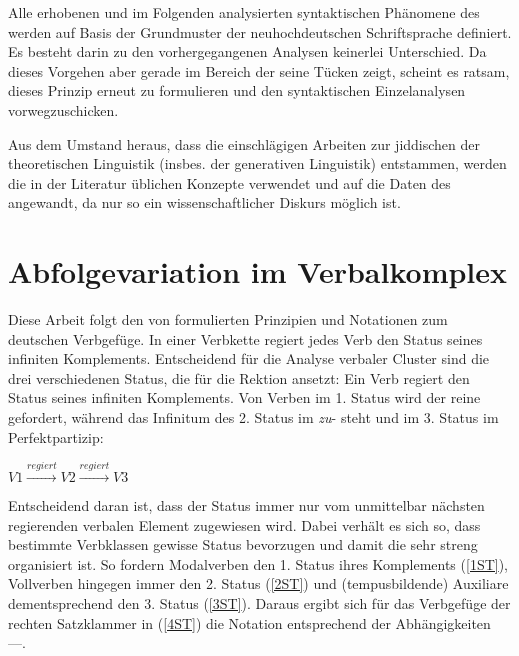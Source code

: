 Alle erhobenen und im Folgenden analysierten syntaktischen Phänomene des \hai{{\LiJi}} werden auf Basis der Grundmuster der neuhochdeutschen Schriftsprache definiert. Es besteht darin zu den vorhergegangenen Analysen keinerlei Unterschied. Da dieses Vorgehen aber gerade im Bereich der  seine Tücken zeigt, scheint es ratsam, dieses Prinzip erneut zu formulieren und den syntaktischen Einzelanalysen vorwegzuschicken.  

Aus dem Umstand heraus, dass die einschlägigen Arbeiten zur jiddischen  der theoretischen Linguistik (insbes. der generativen Linguistik) entstammen, werden die in der Literatur üblichen Konzepte verwendet und auf die Daten des \hai{{\LiJi}} angewandt, da nur so ein wissenschaftlicher Diskurs möglich ist. 


  \section{Abfolgevariation im Verbalkomplex}\label{verbsyntax}
Diese Arbeit folgt den von \citet{Bech1955,Bech1957} formulierten Prinzipien und Notationen zum deutschen Verbgefüge. In einer Verbkette regiert jedes Verb den Status seines infiniten Komplements. Entscheidend für die Analyse verbaler Cluster sind die drei verschiedenen Status, die \citet{Bech1955,Bech1957} für die Rektion ansetzt: Ein Verb regiert den Status seines infiniten Komplements. Von Verben im 1. Status wird der reine  gefordert, während das Infinitum des 2. Status im \textit{zu}- steht und im 3. Status im Perfektpartizip:
  \begin{center}
   $ V1 \xrightarrow{regiert} V2 \xrightarrow{regiert} V3  $ \\
     \end{center}
  Entscheidend daran ist, dass der Status immer nur vom unmittelbar nächsten regierenden verbalen Element zugewiesen wird. Dabei verhält es sich so, dass bestimmte Verbklassen gewisse Status bevorzugen und damit die  sehr streng organisiert ist. So fordern Modalverben den 1. Status ihres Komplements (\ref{1ST}), Vollverben hingegen immer den 2. Status (\ref{2ST}) und (tempusbildende) Auxiliare dementsprechend den 3. Status (\ref{3ST}). Daraus ergibt sich für das Verbgefüge der rechten Satzklammer in (\ref{4ST}) die Notation entsprechend der Abhängigkeiten ––. 
 
 
  
